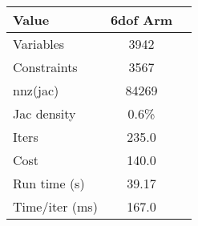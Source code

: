 \begin{tabular}{lcl}
\toprule 
Value & 6dof Arm \\
\midrule 
Variables & 3942 \\
Constraints & 3567 \\
nnz(jac) & 84269 \\
Jac density & 0.6\% \\
Iters & 235.0 \\
Cost & 140.0 \\
Run time (s) & 39.17 \\
Time/iter (ms) & 167.0 \\
\bottomrule 
\end{tabular}
